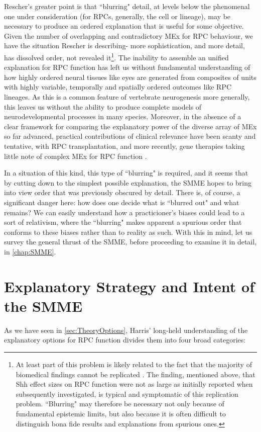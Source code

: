 Rescher's greater point is that ``blurring" detail, at levels below the phenomenal one under consideration (for RPCs, generally, the cell or lineage), may be necessary to produce an ordered explanation that is useful for some objective. Given the number of overlapping and contradictory MEx for RPC behaviour, we have the situation Rescher is describing- more sophistication, and more detail, has dissolved order, not revealed it\footnote{At least part of this problem is likely related to the fact that the majority of biomedical findings cannot be replicated \cite{Ioannidis2005}. The finding, mentioned above, that Shh effect sizes on RPC function were not as large as initially reported when subsequently investigated, is typical and symptomatic of this replication problem. ``Blurring" may therefore be necessary not only because of fundamental epistemic limits, but also because it is often difficult to distinguish bona fide results and explanations from spurious ones.}. The inability to assemble an unified explanation for RPC function has left us without fundamental understanding of how highly ordered neural tissues like eyes are generated from composites of units with highly variable, temporally and spatially ordered outcomes like RPC lineages. As this is a common feature of vertebrate neurogenesis more generally, this leaves us without the ability to produce complete models of neurodevelopmental processes in many species. Moreover, in the absence of a clear framework for comparing the explanatory power of the diverse array of MEx so far advanced, practical contributions of clinical relevance have been scanty and tentative, with RPC transplantation, and more recently, gene therapies taking little note of complex MEx for RPC function \cite{Coles2004,Gaillard2007,Yao2018}.

In a situation of this kind, this type of ``blurring" is required, and it seems that by cutting down to the simplest possible explanation, the SMME hopes to bring into view order that was previously obscured by detail. There is, of course, a significant danger here: how does one decide what is ``blurred out" and what remains? We can easily understand how a practicioner's biases could lead to a sort of relativism, where the ``blurring" makes apparent a spurious order that conforms to these biases rather than to reality as such. With this in mind, let us survey the general thrust of the SMME, before proceeding to examine it in detail, in \autoref{chap:SMME}.

\section{Explanatory Strategy and Intent of the SMME}
\label{sec:SMMEexplanatorystrat}
As we have seen in \autoref{sec:TheoryOptions}, Harris' long-held understanding of the explanatory options for RPC function divides them into four broad categories:

